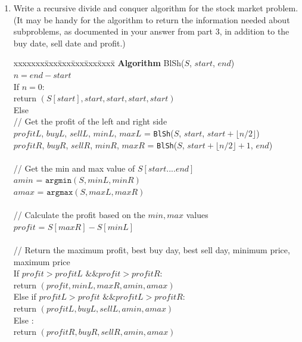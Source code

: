 \documentclass[11pt]{article}
\def\question#1{\red{#1}}
\def\soln#1{\par\blu{#1}} %
\def\blu#1{{\color{blu}#1}}
\def\red#1{{\color{red}#1}}
\begin{document}
\begin{enumerate}
\item \question{Write a recursive divide and conquer algorithm for the stock market problem.} (It may be handy for the algorithm to return
the information needed about subproblems, as documented in
your answer from part 3, in addition to the buy date, sell date and profit.)
\soln{
  \begin{tabbing}
  xxxxxxx\=xxx\=xxx\=xxx\=xxx\=xxxx\= \kill
  \> {\bf Algorithm} BlSh($S$, $start$, $end$) \\
  \>\> $n = end - start$ \\
  \>\> If $n = 0 :$ \\
  \>\>\> return $(S[start], start, start, start, start)$\\
  \>\> Else \\
  \>\>\> // Get the profit of the left and right side \\
  \>\>\> $profitL$, $buyL$, $sellL$, $minL$, $maxL$ = \texttt{BlSh}($S$, $start$, $start + \lfloor n/2 \rfloor$)\\
  \>\>\> $profitR$, $buyR$, $sellR$, $minR$, $maxR$ = \texttt{BlSh}($S$, $start + \lfloor n/2 \rfloor + 1$, $end$)\\ \\
  \>\>\> // Get the min and max value of $S[start....end]$ \\ 
  \>\>\> $amin$ = $\texttt{argmin}(S, minL, minR)$ \\
  \>\>\> $amax$ = $\texttt{argmax}(S, maxL, maxR)$ \\ \\
  \>\>\> // Calculate the profit based on the $min,max$ values \\
  \>\>\> $profit$ = $S[maxR] - S[minL]$ \\ \\
  \>\>\> // Return the maximum profit, best buy day, best sell day, minimum price, maximum price \\
  \>\>\> If $profit > profitL \text{ \&\& } profit > profitR :$ \\
  \>\>\>\> return $(profit, minL, maxR, amin, amax)$\\
  \>\>\> Else if $profitL > profit \text{ \&\& } profitL > profitR :$ \\
  \>\>\>\> return $(profitL, buyL, sellL, amin, amax)$\\
  \>\>\> Else $:$\\
  \>\>\>\> return $(profitR, buyR, sellR, amin, amax)$\\
  \end{tabbing}
}


\end{enumerate}
\end{document}
